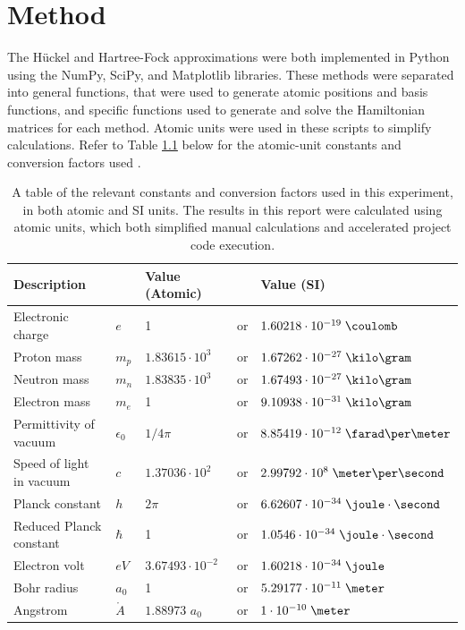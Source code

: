 \chapter{Method}\label{ch:method}

The Hückel and Hartree-Fock approximations were both implemented in Python using the NumPy, SciPy, and Matplotlib libraries. These methods were separated into general functions, that were used to generate atomic positions and basis functions, and specific functions used to generate and solve the Hamiltonian matrices for each method. Atomic units were used in these scripts to simplify calculations. Refer to Table \ref{tab:measuredconstants} below for the atomic-unit constants and conversion factors used \cite{noauthor_appendix_2012}.

\vspace{0.5cm}
\begin{table}[h!]
\begin{center}
\begin{tabular}{ l l l c l}\hline
\textbf{Description}  & \textbf{} & \textbf{Value (Atomic)} & \textbf{} & \textbf{Value (SI)}\\ \hline
Electronic charge & $e$ & 1 & or & $1.60218 \cdot 10^{-19} \; \coulomb$ \\
Proton mass            & $m_{p}$ & $1.83615 \cdot 10^{3}$ & or &  $1.67262 \cdot 10^{-27} \; \kilo\gram$ \\
Neutron mass            & $m_{n}$ & $1.83835 \cdot 10^{3}$ & or &  $1.67493 \cdot 10^{-27} \; \kilo\gram$ \\
Electron mass          & $m_{e}$ & 1 & or &  $9.10938 \cdot 10^{-31} \; \kilo\gram$ \\
Permittivity of vacuum & $\epsilon_{0}$ & $1/4\pi$ & or &  $8.85419 \cdot 10^{-12} \; \farad\per\meter $ \\
Speed of light in vacuum & $c$               & $1.37036 \cdot 10^2$ & or &  $2.99792 \cdot 10^{8} \; \meter\per\second $ \\ 
Planck constant        & $h$ & $2\pi$ & or &  $6.62607 \cdot 10^{-34} \; \joule\cdot\second$ \\
Reduced Planck constant        & $\hbar$ & 1 & or &  $1.0546 \cdot 10^{-34} \; \joule\cdot\second$ \\
Electron volt        & $eV$ & $3.67493 \cdot 10^{-2}$ & or &  $1.60218 \cdot 10^{-34} \; \joule$ \\
Bohr radius        & $a_0$ & 1 & or &  $5.29177 \cdot 10^{-11} \; \meter$ \\
Angstrom        & $\mathring{A}$ & $1.88973$ $a_0$ & or &  $1 \cdot 10^{-10} \; \meter$ \\
\hline
\end{tabular}
\end{center}
\caption{A table of the relevant constants and conversion factors used in this experiment, in both atomic and SI units. The results in this report were calculated using atomic units, which both simplified manual calculations and accelerated project code execution.}
\label{tab:measuredconstants}
\end{table}


